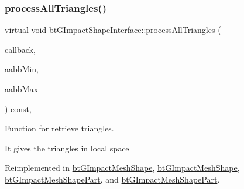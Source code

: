 \mbox{\label{classbtGImpactShapeInterface_ae1dc14b29f49fc0262be72dbe9d7b75b}} 
\subsubsection{\texorpdfstring{process\+All\+Triangles()}{processAllTriangles()}\hspace{0.1cm}{\footnotesize\ttfamily [1/2]}}
{\footnotesize\ttfamily virtual void bt\+G\+Impact\+Shape\+Interface\+::process\+All\+Triangles (\begin{DoxyParamCaption}\item[{\hyperlink{classbtTriangleCallback}{bt\+Triangle\+Callback} $\ast$}]{callback,  }\item[{const bt\+Vector3 \&}]{aabb\+Min,  }\item[{const bt\+Vector3 \&}]{aabb\+Max }\end{DoxyParamCaption}) const\hspace{0.3cm}{\ttfamily [inline]}, {\ttfamily [virtual]}}



Function for retrieve triangles. 

It gives the triangles in local space 

Reimplemented in \hyperlink{classbtGImpactMeshShape_aa2963b35e88c0f423b4b7b10540a5f6b}{bt\+G\+Impact\+Mesh\+Shape}, \hyperlink{classbtGImpactMeshShape_aee93cb18d43817c183fa662d9e7b32e5}{bt\+G\+Impact\+Mesh\+Shape}, \hyperlink{classbtGImpactMeshShapePart_a040a65abd0627d83ecd8bb73be43383e}{bt\+G\+Impact\+Mesh\+Shape\+Part}, and \hyperlink{classbtGImpactMeshShapePart_a85befbcefc4db8ce35db58dc1965d512}{bt\+G\+Impact\+Mesh\+Shape\+Part}.

\mbox{\label{classbtGImpactShapeInterface_ae1dc14b29f49fc0262be72dbe9d7b75b}} 
